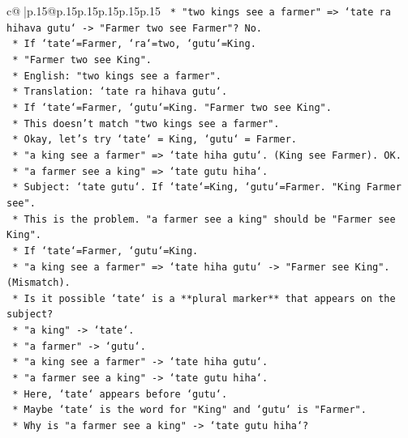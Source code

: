 \documentclass{article}
\begin{document}
{\begin{supertabular}{c@{$\;$}|p{.15\linewidth}@{}p{.15\linewidth}p{.15\linewidth}p{.15\linewidth}p{.15\linewidth}p{.15\linewidth}}
{{{\texttt{                    *   "two kings see a farmer" => `tate ra hihava gutu` {-}> "Farmer two see Farmer"? No.} \\
\texttt{                        *   If `tate`=Farmer, `ra`=two, `gutu`=King.} \\
\texttt{                        *   "Farmer two see King".} \\
\texttt{                        *   English: "two kings see a farmer".} \\
\texttt{                        *   Translation: `tate ra hihava gutu`.} \\
\texttt{                        *   If `tate`=Farmer, `gutu`=King. "Farmer two see King".} \\
\texttt{                        *   This doesn't match "two kings see a farmer".} \\
\texttt{        *   Okay, let's try `tate` = King, `gutu` = Farmer.} \\
\texttt{            *   "a king see a farmer" => `tate hiha gutu`. (King see Farmer). OK.} \\
\texttt{            *   "a farmer see a king" => `tate gutu hiha`.} \\
\texttt{                *   Subject: `tate gutu`. If `tate`=King, `gutu`=Farmer. "King Farmer see".} \\
\texttt{                *   This is the problem. "a farmer see a king" should be "Farmer see King".} \\
\texttt{                *   If `tate`=Farmer, `gutu`=King.} \\
\texttt{                *   "a king see a farmer" => `tate hiha gutu` {-}> "Farmer see King". (Mismatch).} \\
\texttt{        *   Is it possible `tate` is a **plural marker** that appears on the subject?} \\
\texttt{            *   "a king" {-}> `tate`.} \\
\texttt{            *   "a farmer" {-}> `gutu`.} \\
\texttt{            *   "a king see a farmer" {-}> `tate hiha gutu`.} \\
\texttt{            *   "a farmer see a king" {-}> `tate gutu hiha`.} \\
\texttt{            *   Here, `tate` appears before `gutu`.} \\
\texttt{            *   Maybe `tate` is the word for "King" and `gutu` is "Farmer".} \\
\texttt{            *   Why is "a farmer see a king" {-}> `tate gutu hiha`?} \\
}}}
\end{supertabular}}
\end{document}
